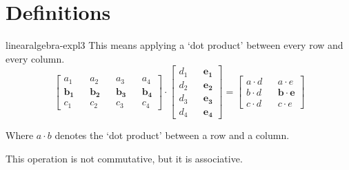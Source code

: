 \documentclass[preview]{standalone}
\begin{document}
\section{Definitions}






\begin{snippet}{linearalgebra-expl3}
This means applying a `dot product' between every row and every column. \\

\[
    \begin{bmatrix} 
        a_1 && a_2 && a_3 && a_4 \\
        \mathbf{b_1} && \mathbf{b_2} && \mathbf{b_3} && \mathbf{b_4} \\
        c_1 && c_2 && c_3 && c_4
    \end{bmatrix}
    \cdot
    \begin{bmatrix} 
        d_1 && \mathbf{e_1} \\
        d_2 && \mathbf{e_2} \\
        d_3 && \mathbf{e_3} \\
        d_4 && \mathbf{e_4}
    \end{bmatrix}
    =
    \begin{bmatrix} 
        a \cdot d && a \cdot e \\
        b \cdot d && \mathbf{b \cdot e} \\
        c \cdot d && c \cdot e
    \end{bmatrix}
\]

Where \(a \cdot b\) denotes the `dot product' between a row and a column.

This operation is not commutative, but it is associative.
\end{snippet}


\end{document}
